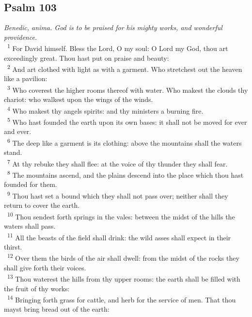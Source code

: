 \documentclass[a5paper,12pt]{article}
\begin{document}
\begin{multicols*}{2}
\section{Psalm 103}
\label{sec:org3fffe0c}
\emph{Benedic, anima. God is to be praised for his mighty works, and wonderful providence.}\\

~\textsuperscript{1} For David himself. Bless the Lord, O my soul: O Lord my God, thou art exceedingly great. Thou hast put on praise and beauty:\\
~\textsuperscript{2} And art clothed with light as with a garment. Who stretchest out the heaven like a pavilion:\\
~\textsuperscript{3} Who coverest the higher rooms thereof with water. Who makest the clouds thy chariot: who walkest upon the wings of the winds.\\
~\textsuperscript{4} Who makest thy angels spirits: and thy ministers a burning fire.\\
~\textsuperscript{5} Who hast founded the earth upon its own bases: it shall not be moved for ever and ever.\\
~\textsuperscript{6} The deep like a garment is its clothing: above the mountains shall the waters stand.\\
~\textsuperscript{7} At thy rebuke they shall flee: at the voice of thy thunder they shall fear.\\
~\textsuperscript{8} The mountains ascend, and the plains descend into the place which thou hast founded for them.\\
~\textsuperscript{9} Thou hast set a bound which they shall not pass over; neither shall they return to cover the earth.\\
~\textsuperscript{10} Thou sendest forth springs in the vales: between the midst of the hills the waters shall pass.\\
~\textsuperscript{11} All the beasts of the field shall drink: the wild asses shall expect in their thirst.\\
~\textsuperscript{12} Over them the birds of the air shall dwell: from the midst of the rocks they shall give forth their voices.\\
~\textsuperscript{13} Thou waterest the hills from thy upper rooms: the earth shall be filled with the fruit of thy works:\\
~\textsuperscript{14} Bringing forth grass for cattle, and herb for the service of men. That thou mayst bring bread out of the earth:\\

\end{multicols*}
\end{document}
